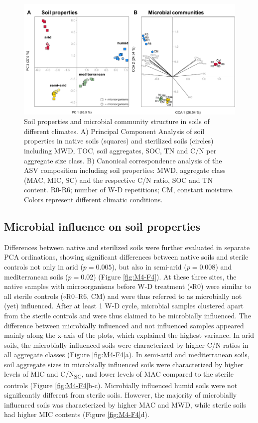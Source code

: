 \begin{figure}[H]
	\centering
	\includegraphics[width=1\textwidth]{img/M4-Figure_3.png}
	\caption[Soil properties and microbial community structure in soils of different climates]{Soil properties and microbial community structure in soils of different climates. A) Principal Component Analysis of soil properties in native soils (squares) and sterilized soils (circles) including MWD, TOC, soil aggregates, SOC, TN and C/N per aggregate size class. B) Canonical correspondence analysis of the ASV composition including soil properties: MWD, aggregate class (MAC, MIC, SC) and the respective C/N ratio, SOC and TN content. R0-R6; number of W-D repetitions; CM, constant moisture. Colors represent different climatic conditions.}
	\label{fig:M4-F3}
\end{figure}

\subsection{Microbial influence on soil properties}

Differences between native and sterilized soils were further evaluated in separate PCA ordinations, showing significant differences between native soils and sterile controls not only in arid (\(p = 0.005\)), but also in semi-arid (\(p = 0.008\)) and mediterranean soils (\(p = 0.02\)) (Figure \ref{fig:M4-F4}). At these three sites, the native samples with microorganisms before W-D treatment (\(\square\)R0) were similar to all sterile controls (\(\circ\)R0--R6, CM) and were thus referred to as microbially not (yet) influenced. After at least 1 W-D cycle, microbial samples clustered apart from the sterile controls and were thus claimed to be microbially influenced. The difference between microbially influenced and not influenced samples appeared mainly along the x-axis of the plots, which explained the highest variance. In arid soils, the microbially influenced soils were characterized by higher C/N ratios in all aggregate classes (Figure \ref{fig:M4-F4}a). In semi-arid and mediterranean soils, soil aggregate sizes in microbially influenced soils were characterized by higher levels of MIC and C/N\textsubscript{SC}, and lower levels of MAC compared to the sterile controls (Figure \ref{fig:M4-F4}b-c). Microbially influenced humid soils were not significantly different from sterile soils. However, the majority of microbially influenced soils was characterized by higher MAC and MWD, while sterile soils had higher MIC contents (Figure \ref{fig:M4-F4}d).

